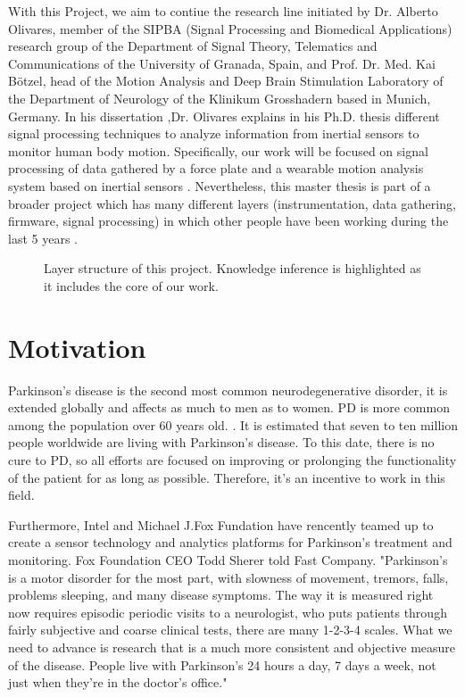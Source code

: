 With this Project, we aim  to contiue the research line initiated by Dr. Alberto Olivares, member of the SIPBA (Signal Processing and Biomedical Applications) research group of the Department of Signal Theory, Telematics and Communications of the University of Granada, Spain, and Prof. Dr. Med. Kai Bötzel, head of the Motion Analysis and Deep Brain Stimulation Laboratory of the Department of Neurology of the Klinikum Grosshadern based in Munich, Germany. In his dissertation ,Dr. Olivares explains in his Ph.D. thesis \cite{A.Olivares2013} different signal processing techniques to analyze information from inertial sensors to monitor human body motion.
Specifically, our work will be focused on signal processing of data gathered  by a force plate and a wearable motion analysis system based on inertial sensors . Nevertheless, this master thesis is part of a broader project which has many different layers (instrumentation, data gathering, firmware, signal processing) in which other people have been working during the last 5 years .

 \begin{figure}[H]
 	\centering
 	\caption{Layer structure of this project. Knowledge inference is highlighted as it includes the core of our work.}
 	\label{fig:layer}
 \end{figure}

\section{Motivation}
Parkinson’s disease is the second most common neurodegenerative disorder, it is extended globally and affects as much to men as to women. PD is more common among the population over 60 years old. . It is estimated that seven  to ten million people worldwide are living with Parkinson’s disease. To this date, there is no cure to PD, so all efforts are focused on improving or prolonging the functionality of the patient for as long as possible. Therefore, it’s an incentive to work in this field. \cite{ParkinsonDisease}\cite{pdf}

Furthermore, Intel and Michael J.Fox Fundation have rencently teamed up to create a sensor technology and analytics platforms for Parkinson’s treatment and monitoring. Fox Foundation CEO Todd Sherer told Fast Company. "Parkinson’s is a motor disorder for the most part, with slowness of movement, tremors, falls, problems sleeping, and many disease symptoms. The way it is measured right now requires episodic periodic visits to a neurologist, who puts patients through fairly subjective and coarse clinical tests, there are many 1-2-3-4 scales. What we need to advance is research that is a much more consistent and objective measure of the disease. People live with Parkinson’s 24 hours a day, 7 days a week, not just when they're in the doctor’s office."\cite{IntelAndMjf}

